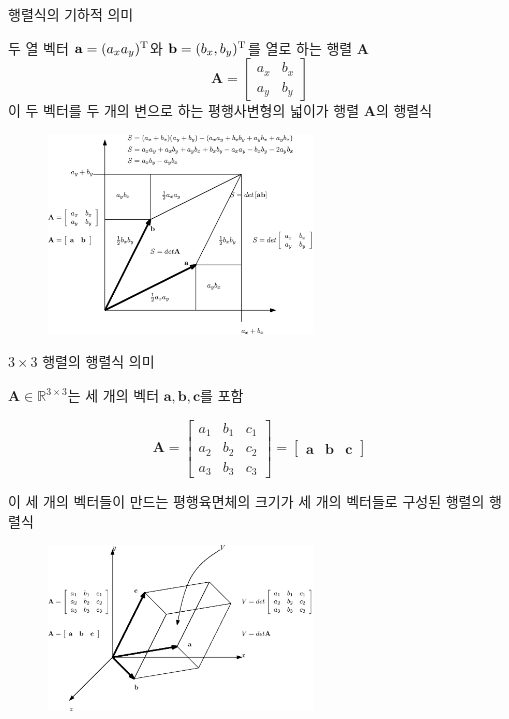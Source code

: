\documentclass{beamer}
\begin{document}
\begin{frame}{행렬식의 기하적 의미}

두 열 벡터 $\mathbf a = (a_x a_y )^{\rm T}$와 $\mathbf b = (b_x , b_y)^{\rm T}$를 열로 하는 행렬 $\mathbf A$
$$\mathbf A = \left [ 
\begin{array}{cc}
a_x & b_x \\
a_y & b_y
\end{array}
\right ]
$$
이 두 벡터를 두 개의 변으로 하는 평행사변형의 넓이가 행렬 $\mathbf A$의 행렬식



\begin{figure}
\includegraphics[width=7cm]{Math_matrix/determinantGeo.eps}
\end{figure}

\end{frame}


\begin{frame}{$3 \times 3$ 행렬의 행렬식 의미}

$\mathbf A \in \mathbb R^{3 \times 3}$는 세 개의 벡터 $\mathbf a, \mathbf b, \mathbf c$를 포함

$$
\mathbf A = \left [ \begin{array}{ccc}
a_1 & b_1 & c_1 \\
a_2 & b_2 & c_2 \\
a_3 & b_3 & c_3 
\end{array} \right ] =
\left [ \begin{array}{ccc}
\mathbf a & \mathbf b & \mathbf c
\end{array} \right ] 
$$

이 세 개의 벡터들이 만드는 평행육면체의 크기가 세 개의 벡터들로 구성된 행렬의 행렬식


\begin{figure}
\includegraphics[width=7cm]{Math_matrix/determinantGeo3D.eps}
\end{figure}

\end{frame}
\end{document}
